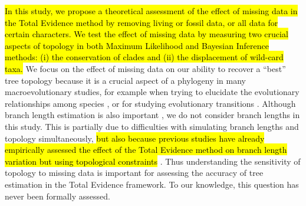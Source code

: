 \documentclass[12pt,letterpaper]{article}
\begin{document}
\hl{In this study, we propose a theoretical assessment of the effect of missing data in the Total Evidence method by removing living or fossil data, or all data for certain characters.
We test the effect of missing data by measuring two crucial aspects of topology in both Maximum Likelihood and Bayesian Inference methods: (i) the conservation of clades and (ii) the displacement of wild-card taxa.}
We focus on the effect of missing data on our ability to recover a ``best'' tree topology because it is a crucial aspect of a phylogeny in many macroevolutionary studies, for example when trying to elucidate the evolutionary relationships among species \citep[e.g.][]{meredithimpacts2011,jetzthe2012}, or for studying evolutionary transitions \citep[e.g.][]{friedmanexplosive2010}.
Although branch length estimation is also important \citep[namely for timing extinction and/or speciation events; e.g.][]{ronquista2012}, we do not consider branch lengths in this study.
This is partially due to difficulties with simulating branch lengths and topology simultaneously, \hl{but also because previous studies have already empirically assessed the effect of the Total Evidence method on branch length variation but using topological constraints} \citep{ronquista2012,schragocombining2013,slaterphylogenetic2013,beckancient2014}.
Thus understanding the sensitivity of topology to missing data is important for assessing the accuracy of tree estimation in the Total Evidence framework. To our knowledge, this question has never been formally assessed.
\end{document}

